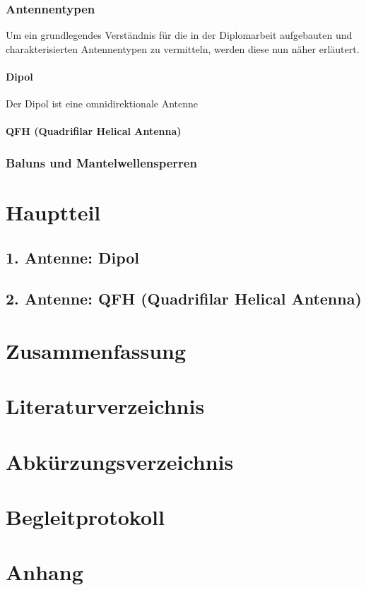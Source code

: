 \documentclass[12pt]{scrreprt}
\begin{document}
	\subsection{Antennentypen}
	Um ein grundlegendes Verständnis für die in der Diplomarbeit aufgebauten und charakterisierten Antennentypen zu vermitteln, werden diese nun näher erläutert.
	
	\subsubsection{Dipol}
	Der Dipol ist eine omnidirektionale Antenne
		
	\subsubsection{QFH (Quadrifilar Helical Antenna)}
	
	\subsection{Baluns und Mantelwellensperren}
	
	
	
	\pagebreak
	
	\chapter{Hauptteil}
	\section{1. Antenne: Dipol}
	
	\section{2. Antenne: QFH (Quadrifilar Helical Antenna)}
	
	
	\pagebreak
	
	\chapter{Zusammenfassung}
	\pagebreak
	
	\chapter{Literaturverzeichnis}
	\pagebreak
	
	\listoffigures
	\pagebreak
	
	\chapter{Abkürzungsverzeichnis}
	\pagebreak
	
	\chapter{Begleitprotokoll}
	
	\chapter{Anhang}
	
	

	
\end{document}
